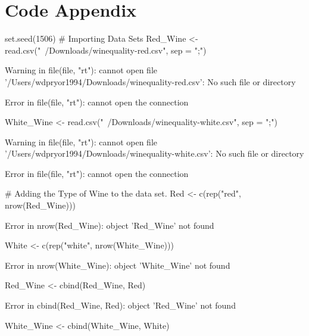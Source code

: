 \documentclass[letterpaper]{article}\usepackage[]{graphicx}\usepackage[]{color}
\begin{document}
\section*{Code Appendix}
\begin{Schunk}
\begin{Sinput}
set.seed(1506)
# Importing Data Sets
Red_Wine <- read.csv("~/Downloads/winequality-red.csv", sep = ";")
\end{Sinput}
\begin{Soutput}
Warning in file(file, "rt"): cannot open file '/Users/wdpryor1994/Downloads/winequality-red.csv': No such file or directory
\end{Soutput}
\begin{Soutput}
Error in file(file, "rt"): cannot open the connection
\end{Soutput}
\begin{Sinput}
White_Wine <- read.csv("~/Downloads/winequality-white.csv", sep = ";")
\end{Sinput}
\begin{Soutput}
Warning in file(file, "rt"): cannot open file '/Users/wdpryor1994/Downloads/winequality-white.csv': No such file or directory
\end{Soutput}
\begin{Soutput}
Error in file(file, "rt"): cannot open the connection
\end{Soutput}
\begin{Sinput}
# Adding the Type of Wine to the data set.
Red <- c(rep("red", nrow(Red_Wine)))
\end{Sinput}
\begin{Soutput}
Error in nrow(Red_Wine): object 'Red_Wine' not found
\end{Soutput}
\begin{Sinput}
White <- c(rep("white", nrow(White_Wine)))
\end{Sinput}
\begin{Soutput}
Error in nrow(White_Wine): object 'White_Wine' not found
\end{Soutput}
\begin{Sinput}
Red_Wine <- cbind(Red_Wine, Red)
\end{Sinput}
\begin{Soutput}
Error in cbind(Red_Wine, Red): object 'Red_Wine' not found
\end{Soutput}
\begin{Sinput}
White_Wine <- cbind(White_Wine, White)
\end{Sinput}
\begin{Soutput}

\end{Soutput}
\end{Schunk}
\end{document}
